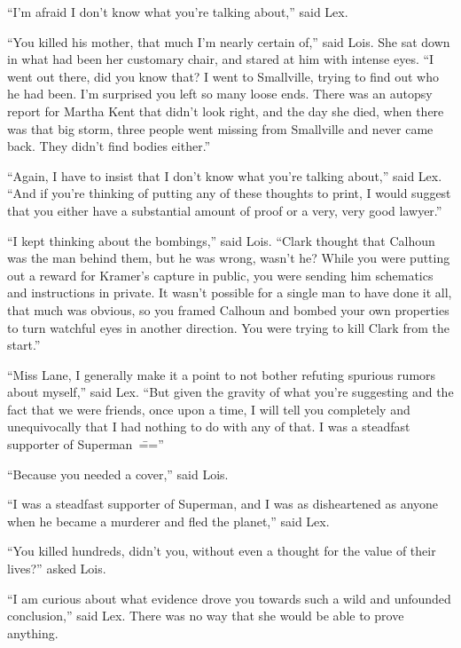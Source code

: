 ``I'm afraid I don't know what you're talking about,'' said Lex.

``You killed his mother, that much I'm nearly certain of,'' said Lois.
She sat down in what had been her customary chair, and stared at him
with intense eyes. ``I went out there, did you know that? I went to
Smallville, trying to find out who he had been. I'm surprised you left
so many loose ends. There was an autopsy report for Martha Kent that
didn't look right, and the day she died, when there was that big storm,
three people went missing from Smallville and never came back. They
didn't find bodies either.''

``Again, I have to insist that I don't know what you're talking about,''
said Lex. ``And if you're thinking of putting any of these thoughts to
print, I would suggest that you either have a substantial amount of
proof or a very, very good lawyer.''

``I kept thinking about the bombings,'' said Lois. ``Clark thought that
Calhoun was the man behind them, but he was wrong, wasn't he? While you
were putting out a reward for Kramer's capture in public, you were
sending him schematics and instructions in private. It wasn't possible
for a single man to have done it all, that much was obvious, so you
framed Calhoun and bombed your own properties to turn watchful eyes in
another direction. You were trying to kill Clark from the start.''

``Miss Lane, I generally make it a point to not bother refuting spurious
rumors about myself,'' said Lex. ``But given the gravity of what you're
suggesting and the fact that we were friends, once upon a time, I will
tell you completely and unequivocally that I had nothing to do with any
of that. I was a steadfast supporter of Superman~\===''

``Because you needed a cover,'' said Lois.

``I was a steadfast supporter of Superman, and I was as disheartened as
anyone when he became a murderer and fled the planet,'' said Lex.

``You killed hundreds, didn't you, without even a thought for the value
of their lives?'' asked Lois.

``I am curious about what evidence drove you towards such a wild and
unfounded conclusion,'' said Lex. There was no way that she would be
able to prove anything.

